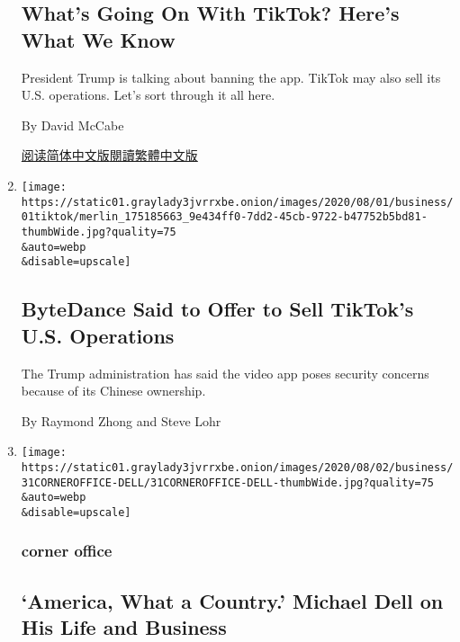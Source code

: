 \begin{enumerate}
{  \subsection{What's Going On With TikTok? Here's What We
  Know}\label{whats-going-on-with-tiktok-heres-what-we-know}}

  President Trump is talking about banning the app. TikTok may also sell
  its U.S. operations. Let's sort through it all here.

  By David McCabe

  \href{https://cn.nytimes3xbfgragh.onion/technology/20200803/tiktok-trump-microsoft-bytedance-china-ban/}{阅读简体中文版}\href{https://cn.nytimes3xbfgragh.onion/technology/20200803/tiktok-trump-microsoft-bytedance-china-ban/zh-hant/}{閱讀繁體中文版}
\item
  \href{/2020/08/01/technology/tiktok-sale-trump-ban.html}{}

  \texttt{[image: https://static01.graylady3jvrrxbe.onion/images/2020/08/01/business/01tiktok/merlin\_175185663\_9e434ff0-7dd2-45cb-9722-b47752b5bd81-thumbWide.jpg?quality=75\\\&auto=webp\\\&disable=upscale]}

  \hypertarget{bytedance-said-to-offer-to-sell-tiktoks-us-operations}{%
  \subsection{ByteDance Said to Offer to Sell TikTok's U.S.
  Operations}\label{bytedance-said-to-offer-to-sell-tiktoks-us-operations}}

  The Trump administration has said the video app poses security
  concerns because of its Chinese ownership.

  By Raymond Zhong and Steve Lohr
\item
  \href{/2020/07/31/business/michael-dell-corner-office.html}{}

  \texttt{[image: https://static01.graylady3jvrrxbe.onion/images/2020/08/02/business/31CORNEROFFICE-DELL/31CORNEROFFICE-DELL-thumbWide.jpg?quality=75\\\&auto=webp\\\&disable=upscale]}

  \hypertarget{corner-office}{%
  \subsubsection{corner office}\label{corner-office}}

  \hypertarget{america-what-a-country-michael-dell-on-his-life-and-business}{%
  \subsection{`America, What a Country.' Michael Dell on His Life and
  Business}\label{america-what-a-country-michael-dell-on-his-life-and-business}}


\end{enumerate}
